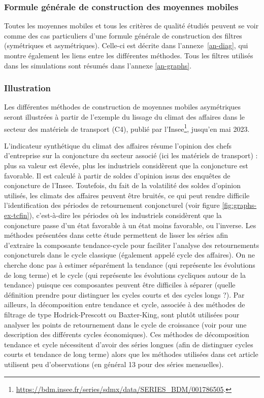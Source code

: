 \documentclass[
  12pt,
  a4paper,french]{article}
\newcommand\1{\mathds{1}}
\begin{document}
\hypertarget{subsec-formulegen}{%
\subsubsection{Formule générale de construction des moyennes mobiles}\label{subsec-formulegen}}

Toutes les moyennes mobiles et tous les critères de qualité étudiés peuvent se voir comme des cas particuliers d'une formule générale de construction des filtres (symétriques et asymétriques).
Celle-ci est décrite dans l'annexe~\ref{an-diag}, qui montre également les liens entre les différentes méthodes.
Tous les filtres utilisés dans les simulations sont résumés dans l'annexe \ref{an-graphs}.

\hypertarget{illustration}{%
\subsubsection{Illustration}\label{illustration}}

Les différentes méthodes de construction de moyennes mobiles asymétriques seront illustrées à partir de l'exemple du lissage du climat des affaires dans le secteur des matériels de transport (C4), publié par l'Insee\footnote{
  \url{https://bdm.insee.fr/series/sdmx/data/SERIES_BDM/001786505}.}, jusqu'en mai 2023.

L'indicateur synthétique du climat des affaires résume l'opinion des chefs d'entreprise sur la conjoncture du secteur associé (ici les matériels de transport) : plus sa valeur est élevée, plus les industriels considèrent que la conjoncture est favorable.
Il est calculé à partir de soldes d'opinion issus des enquêtes de conjoncture de l'Insee.
Toutefois, du fait de la volatilité des soldes d'opinion utilisés, les climats des affaires peuvent être bruités, ce qui peut rendre difficile l'identification des périodes de retournement conjoncturel (voir figure \ref{fig:graphs-ex-tcfin}), c'est-à-dire les périodes où les industriels considèrent que la conjoncture passe d'un état favorable à un état moins favorable, ou l'inverse.
Les méthodes présentées dans cette étude permettent de lisser les séries afin d'extraire la composante tendance-cycle pour faciliter l'analyse des retournements conjoncturels dans le cycle classique (également appelé cycle des affaires).
On ne cherche donc pas à estimer séparément la tendance (qui représente les évolutions de long terme) et le cycle (qui représente les évolutions cycliques autour de la tendance) puisque ces composantes peuvent être difficiles à séparer (quelle définition prendre pour distinguer les cycles courts et des cycles longs ?).
Par ailleurs, la décomposition entre tendance et cycle, associée à des méthodes de filtrage de type Hodrick-Prescott ou Baxter-King, sont plutôt utilisées pour analyser les points de retournement dans le cycle de croissance (voir \textcite{ferrara2009caracterisationcycles} pour une description des différents cycles économiques).
Ces méthodes de décomposition tendance et cycle nécessitent d'avoir des séries longues (afin de distinguer cycles courts et tendance de long terme) alors que les méthodes utilisées dans cet article utilisent peu d'observations (en général 13 pour des séries mensuelles).
\end{document}
